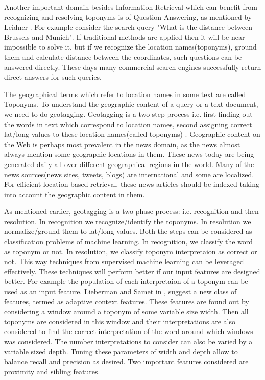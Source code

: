 \documentclass[
     11pt,         %
     a4paper,      %
     oneside,
     ]{article}
\begin{document}
Another important domain besides Information Retrieval which can benefit from recognizing and resolving toponyms is of Question Answering, as mentioned by Leidner \cite{Leidner:2008:PhD}. For example consider the search query "What is the distance between Brussels and Munich". If traditional methods are applied then it will be near impossible to solve it, but if we recognize the location names(toponyms), ground them and calculate distance between the coordinates, such questions can be answered directly. These days many commercial search engines successfully return direct answers for such queries. 

The geographical terms which refer to location names in some text are called Toponyms. To understand the geographic content of a query or a text document, we need to do geotagging. Geotagging is a two step process i.e. first finding out the words in text which correspond to location names, second assigning correct lat/long values to these location names(called toponyms) \cite{Lieberman12adaptivecontext}. Geographic content on the Web is perhaps most prevalent in the news domain, as the news almost always mention some geographic locations in them. These news today are being generated daily all over different geographical regions in the world. Many of the news sources(news sites, tweets, blogs) are international and some are localized. For efficient location-based retrieval, these news articles should be indexed taking into account the geographic content in them.

As mentioned earlier, geotagging is a two phase process: i.e. recognition and then resolution. In recognition we recognize/identify the toponyms. In resolution we normalize/ground them to lat/long values. Both the steps can be considered as classification problems of machine learning. In recognition, we classify the word as toponym or not. In resolution, we classify toponym interpretaion as correct or not. This way techniques from supervised machine learning can be leveraged effectively. These techniques will perform better if our input features are designed better. For example the population of each interpretaion of a toponym can be used as an input feature. Lieberman and Samet in \cite{Lieberman12adaptivecontext}, suggest a new class of features, termed as adaptive context features. These features are found out by considering a window around a toponym of some variable size width. Then all toponyms are considered in this window and their interpretations are also considered to find the correct interpretation of the word around which windows was considered. The number interpretations to consider can also be varied by a variable sized depth. Tuning these parameters of width and depth allow to balance recall and precision as desired. Two important features considered are proximity and sibling features. 
\end{document}
